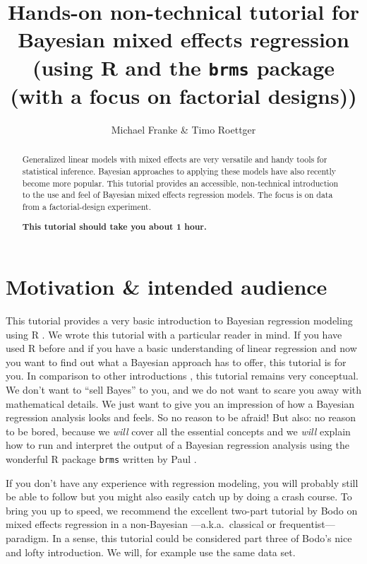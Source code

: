 \documentclass[fleqn,reqno,12pt]{article}
\title{Hands-on non-technical tutorial for Bayesian mixed effects regression \\ \normalsize{(using R and the \texttt{brms} package (with a focus on factorial designs))}}
\author{Michael Franke \& Timo Roettger}
\date{}
\begin{document}
\maketitle

\begin{abstract}
  Generalized linear models with mixed effects are very versatile and handy tools for statistical inference. Bayesian approaches to applying these models have also recently become more popular. This tutorial provides an accessible, non-technical introduction to the use and feel of Bayesian mixed effects regression models. The focus is on data from a factorial-design experiment. \\
  
  \medskip
  
  \noindent \textbf{This tutorial should take you about 1 hour.}
\end{abstract}

\section{Motivation \& intended audience}

This tutorial provides a very basic introduction to Bayesian regression modeling using R \citep{Manual}. We wrote this tutorial with a particular reader in mind. If you have used R before and if you have a basic understanding of linear regression and now you want to find out what a Bayesian approach has to offer, this tutorial is for you. In comparison to other introductions \citep[e.g.][]{SorensenHohensteinb2016:Bayesian-linear}, this tutorial remains very conceptual. We don’t want to ``sell Bayes'' to you, and we do not want to scare you away with mathematical details. We just want to give you an impression of how a Bayesian regression analysis looks and feels. So no reason to be afraid! But also: no reason to be bored, because we \emph{will} cover all the essential concepts and we \emph{will} explain how to run and interpret the output of a Bayesian regression analysis using the wonderful R package \texttt{brms} written by Paul \citep{buerkner2016brms}.

If you don’t have any experience with regression modeling, you will probably still be able to follow but you might also easily catch up by doing a crash course. To bring you up to speed, we recommend the excellent two-part tutorial by Bodo \citep{Winter2013:Linear-models-a} on mixed effects regression in a non-Bayesian ---a.k.a.~classical or frequentist--- paradigm. In a sense, this tutorial could be considered part three of Bodo's nice and lofty introduction. We will, for example use the same data set.
\end{document}
